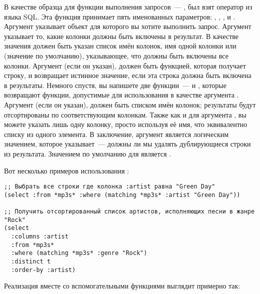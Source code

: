 В качестве образца для функции выполнения запросов~---  , был взят оператор
 из языка SQL. Эта функция принимает пять именованных параметров:
, , ,  и .
Аргумент  указывает объект  для которого вы хотите выполнить
запрос.  Аргумент  указывает то, какие колонки должны быть включены в
результат.  В качестве значения должен быть указан список имён колонок, имя одной колонки
или  (значение по умолчанию), указывающее, что должны быть включены все колонки.
Аргумент  (если он указан), должен быть функцией, которая получает строку, и
возвращает истинное значение, если эта строка должна быть включена в результаты.  Немного
спустя, вы напишете две функции~---  и , которые возвращают
функции, допустимые для использования в качестве аргумента .  Аргумент
 (если он указан), должен быть списком имён колонок; результаты будут
отсортированы по соответствующим колонкам.  Также как и для аргумента , вы
можете указать лишь одну колонку, просто используя её имя, что эквивалентно списку из
одного элемента.  В заключение, аргумент  является логическим значением,
которое указывает~--- должны ли мы удалять дублирующиеся строки из результата.  Значением
по умолчанию для  является .

Вот несколько примеров использования :

\begin{lstlisting}
;; Выбрать все строки где колонка :artist равна "Green Day"
(select :from *mp3s* :where (matching *mp3s* :artist "Green Day"))

;; Получить отсортированный список артистов, исполняющих песни в жанре "Rock"
(select
  :columns :artist
  :from *mp3s*
  :where (matching *mp3s* :genre "Rock")
  :distinct t
  :order-by :artist)
\end{lstlisting}

Реализация  вместе со вспомогательными функциями выглядит примерно так:

